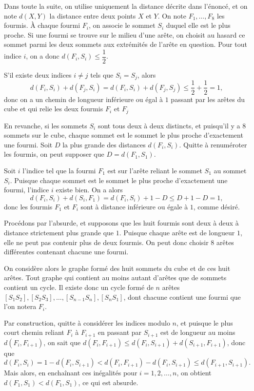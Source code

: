Dans toute la suite, on utilise uniquement la distance décrite dans l'énoncé, et on note $d(X,Y)$ la distance entre deux points $X$ et $Y$.
On note $F_1, \ldots , F_8$ les fourmis. À chaque fourmi $F_i$, on associe le sommet $S_i$ duquel elle est le plus proche.
Si une fourmi se trouve sur le milieu d'une arête, on choisit au hasard ce sommet parmi les deux sommets aux extrémités de l'arête en question. Pour tout indice $i$, on a donc $d(F_i,S_i)\le \dfrac{1}{2}$.

\medskip

S'il existe deux indices $i\neq j$ tels que $S_i=S_j$, alors
$$d(F_i,S_i)+d(F_j,S_i)=d(F_i,S_i)+d(F_j,S_j) \le \frac{1}{2}+\frac{1}{2} =1,$$
donc on a un chemin de longueur inférieure ou égal à $1$ passant par les arêtes du cube et qui relie les deux fourmis $F_i$ et $F_j$

\medskip

En revanche, si les sommets $S_i$ sont tous deux à deux distincts, et puisqu'il y a $8$ sommets sur le cube, chaque sommet est le sommet le plus proche d'exactement une fourmi. Soit $D$ la plus grande des distances
$d(F_i,S_i)$. Quitte à renuméroter les fourmis, on peut supposer que $D=d(F_1,S_1)$.

Soit $i$ l'indice tel que la fourmi $F_1$ est sur l'arête reliant le sommet $S_1$ au sommet $S_i$. Puisque chaque sommet est le sommet le plus proche d'exactement une fourmi, l'indice $i$ existe bien. On a alors
$$d(F_i,S_i)+d(S_i,F_1) = d(F_i,S_i)+1-D \le D+1-D=1,$$
donc les fourmis $F_1$ et $F_i$ sont à distance inférieure ou égale à $1$, comme désiré.


\altsol

Procédons par l'absurde, et supposons que les huit fourmis sont
deux à deux à distance strictement plus grande que $1$.
Puisque chaque arête est de longueur $1$, elle ne peut pas
contenir plus de deux fourmis. On peut donc choisir $8$ arêtes différentes contenant chacune une fourmi.

\medskip

On considère alors le graphe formé des huit sommets du cube et de ces huit arêtes.
Tout graphe qui contient au moins autant d'arêtes que de sommets contient un cycle.
Il existe donc un cycle formé de $n$ arêtes $[S_1 S_2],
[S_2 S_3], \ldots, [S_{n-1} S_n], [S_n S_1]$, dont chacune contient une fourmi que l'on notera $F_i$.

Par construction, quitte à considérer les indices modulo $n$, et puisque le plus court chemin reliant $F_i$
à $F_{i+1}$ en passant par $S_{i+1}$ est de longueur au moins $d(F_i,F_{i+1})$, on sait que $d(F_i,F_{i+1}) \le
d(F_i,S_{i+1}) + d(S_{i+1},F_{i+1})$, donc que
$$d(F_i,S_i) = 1 - d(F_i,S_{i+1}) < d(F_i,F_{i+1}) - d(F_i,S_{i+1}) \le d(F_{i+1},S_{i+1}).$$
Mais alors, en enchaînant ces inégalités pour $i = 1,2,\ldots,n$, on obtient $d(F_1,S_1) < d(F_1,S_1)$, ce qui est absurde.

